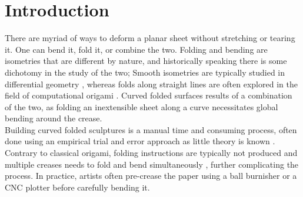 \section{Introduction}
There are myriad of ways to deform a planar sheet without stretching or tearing it. One can bend it, fold it, or combine the two. Folding and bending are isometries that are different by nature, and historically speaking there is some dichotomy in the study of the two; Smooth isometries are typically studied in differential geometry \cite{do_carmo}, whereas folds along straight lines are often explored in the field of computational origami \cite{origami_book}. Curved folded surfaces \cite{huffman} results of a combination of the two, as folding an inextensible sheet along a curve necessitates global bending around the crease. \\
Building curved folded sculptures is a manual time and consuming process, often done using an empirical trial and error approach  as little theory is known \cite{curved_review,huffmann_reconstructing}. Contrary to classical origami, folding instructions are typically not produced and multiple  creases needs to fold and bend simultaneously \cite{StringActuated:2017}, further complicating the process. In practice, artists often pre-crease the paper using a ball burnisher or a CNC plotter before carefully bending it.




